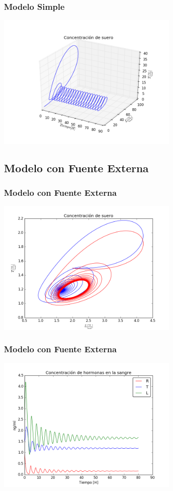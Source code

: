 \documentclass[10pt]{beamer}
\begin{document}
\begin{frame}
\frametitle{Modelo Simple}
\begin{center}
 \includegraphics[width=3.5in]{imagenes/Graficas/Modelos_Simples/g6_modelo2.png}
\end{center}
\end{frame}

\subsection{Modelo con Fuente Externa}
\begin{frame}
\frametitle{Modelo con Fuente Externa}
\begin{center}
 \includegraphics[width=3.5in]{imagenes/Graficas/Modelo_fuente_externa/FE_modelo1_concentracion_de_suero.png}
\end{center}
\end{frame}

\begin{frame}
\frametitle{Modelo con Fuente Externa}
\begin{center}
 \includegraphics[width=3.5in]{imagenes/Graficas/Modelo_fuente_externa/FE_modelo1_valor_critico.png}
\end{center}
\end{frame}
\end{document}
